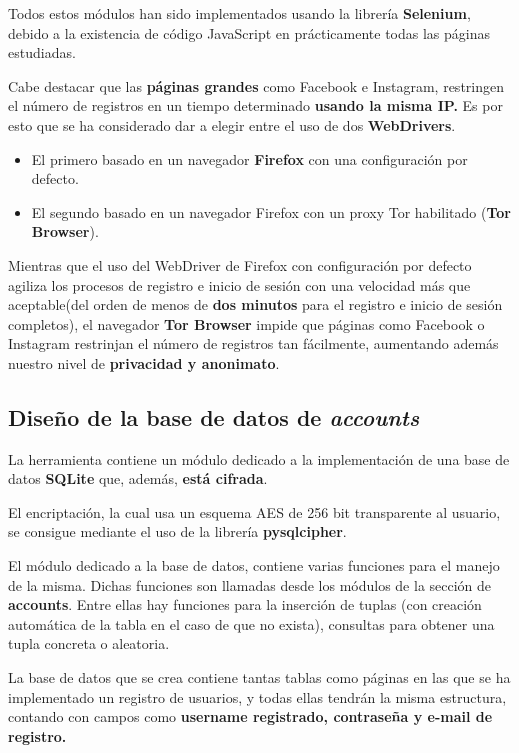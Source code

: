 Todos estos módulos han sido implementados usando la librería \textbf{Selenium}, debido a la existencia de código JavaScript en prácticamente todas las páginas estudiadas. 

Cabe destacar que las \textbf{páginas grandes} como Facebook e Instagram, restringen el número de registros en un tiempo determinado \textbf{usando la misma IP.} Es por esto que se ha considerado dar a elegir entre el uso de dos \textbf{WebDrivers}. 

\begin{itemize}
	\item El primero basado en un navegador \textbf{Firefox} con una configuración por defecto.
	\item El segundo basado en un navegador Firefox con un proxy Tor habilitado (\textbf{Tor Browser}).
\end{itemize} 

Mientras que el uso del WebDriver de Firefox con configuración por defecto agiliza los procesos de registro e inicio de sesión con una velocidad más que aceptable(del orden de menos de\textbf{ dos minutos} para el registro e inicio de sesión completos), el navegador \textbf{Tor Browser} impide que páginas como Facebook o Instagram restrinjan el número de registros tan fácilmente, aumentando además nuestro nivel de \textbf{privacidad y anonimato}.

\subsection{Diseño de la base de datos de \textit{accounts}}

La herramienta contiene un módulo dedicado a la implementación de una base de datos \textbf{SQLite }que, además, \textbf{está cifrada}.

El encriptación, la cual usa un esquema AES de 256 bit transparente al usuario, se consigue mediante el uso de la librería \textbf{pysqlcipher}.

El módulo dedicado a la base de datos, contiene varias funciones para el manejo de la misma. Dichas funciones son llamadas desde los módulos de la sección de \textbf{accounts}. Entre ellas hay funciones para la inserción de tuplas (con creación automática de la tabla en el caso de que no exista), consultas para obtener una tupla concreta o aleatoria.

La base de datos que se crea contiene tantas tablas como páginas en las que se ha implementado un registro de usuarios, y todas ellas tendrán la misma estructura, contando con campos como \textbf{username registrado, contraseña y e-mail de registro.}

